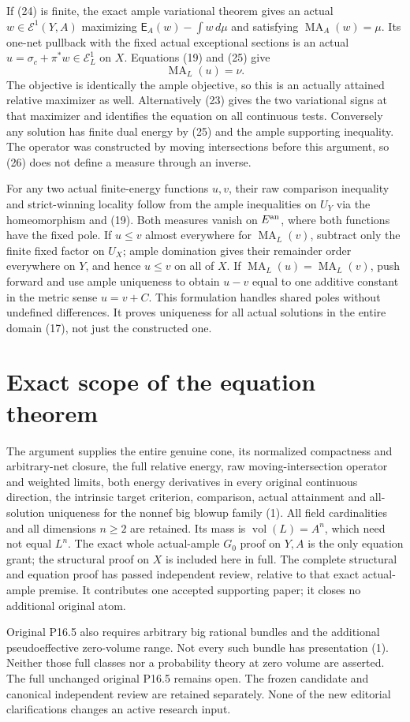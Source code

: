 \documentclass[11pt]{article}
\newcommand{\vol}{\operatorname{vol}}
\newcommand{\MA}{\operatorname{MA}}
\begin{document}
If (24) is finite, the exact ample variational theorem gives an
actual $w\in\mathcal E^1(Y,A)$ maximizing
$\mathsf E_A(w)-\int w\,d\mu$ and satisfying $\MA_A(w)=\mu$.
Its one-net pullback with the fixed actual exceptional sections is
an actual $u=\sigma_c+\pi^*w\in\mathcal E_L^1$ on $X$.
Equations (19) and (25) give
\[
                              \MA_L(u)=\nu.              \tag{26}
\]
The objective is identically the ample objective, so this is an
actually attained relative maximizer as well. Alternatively (23)
gives the two variational signs at that maximizer and identifies
the equation on all continuous tests. Conversely any solution
has finite dual energy by (25) and the ample supporting inequality.
The operator was constructed by moving intersections before this
argument, so (26) does not define a measure through an inverse.

For any two actual finite-energy functions $u,v$, their raw
comparison inequality and strict-winning locality follow from
the ample inequalities on $U_Y$ via the homeomorphism and (19).
Both measures vanish on $E^{\rm an}$, where both functions have
the fixed pole. If $u\leq v$ almost everywhere for $\MA_L(v)$,
subtract only the finite fixed factor on $U_X$; ample domination
gives their remainder order everywhere on $Y$, and hence $u\leq v$
on all of $X$. If $\MA_L(u)=\MA_L(v)$, push forward and use
ample uniqueness to obtain $u-v$ equal to one additive constant
in the metric sense $u=v+C$. This formulation handles shared poles
without undefined differences. It proves uniqueness for all actual
solutions in the entire domain (17), not just the constructed one.

\section{Exact scope of the equation theorem}
The argument supplies the entire genuine cone, its normalized
compactness and arbitrary-net closure, the full relative energy,
raw moving-intersection operator and weighted limits, both energy
derivatives in every original continuous direction, the intrinsic
target criterion, comparison, actual attainment and all-solution
uniqueness for the nonnef big blowup family (1). All field cardinalities
and all dimensions $n\geq2$ are retained. Its mass is
$\vol(L)=A^n$, which need not equal $L^n$.
The exact whole actual-ample $G_0$ proof on $Y,A$ is the only
equation grant; the structural proof on $X$ is included here in full.
The complete structural and equation proof has passed independent
review, relative to that exact actual-ample premise. It contributes
one accepted supporting paper; it closes no additional original atom.

Original P16.5 also requires arbitrary big rational bundles and the
additional pseudoeffective zero-volume range. Not every such bundle
has presentation (1). Neither those full classes nor a probability
theory at zero volume are asserted. The full unchanged original
P16.5 remains open. The frozen candidate and canonical independent review are retained
separately. None of the new editorial clarifications changes an active
research input.
\end{document}
